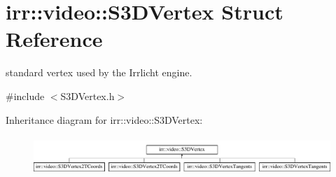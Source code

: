 \hypertarget{structirr_1_1video_1_1S3DVertex}{}\section{irr\+:\+:video\+:\+:S3\+D\+Vertex Struct Reference}
\label{structirr_1_1video_1_1S3DVertex}


standard vertex used by the Irrlicht engine.  




{\ttfamily \#include $<$S3\+D\+Vertex.\+h$>$}

Inheritance diagram for irr\+:\+:video\+:\+:S3\+D\+Vertex\+:\begin{figure}[H]
\begin{center}
\leavevmode
\includegraphics[height=1.458333cm]{structirr_1_1video_1_1S3DVertex}
\end{center}
\end{figure}
